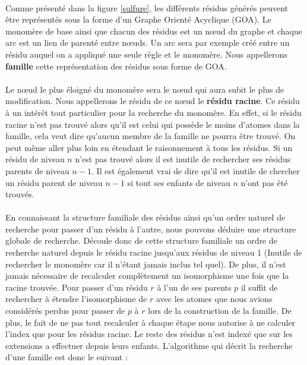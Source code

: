 \documentclass[12pt,french,twoside]{report}
\begin{document}
\paragraph{}Comme présenté dans la figure \ref{sulfure}, les différents résidus générés peuvent être représentés sous la forme
d'un Graphe Orienté Acyclique (GOA). Le monomère de base ainsi que chacun des résidus est un n\oe{}ud du graphe et chaque arc est un
lien de parenté entre n\oe{}uds. Un arc sera par exemple créé entre un résidu auquel on a appliqué une seule règle et le monomère.
Nous appellerons \textbf{famille} cette représentation des résidus sous forme de GOA.

\paragraph{}Le n\oe{}ud le plus éloigné du monomère sera le n\oe{}ud
qui aura subit le plus de modification. Nous appellerons le résidu de ce n\oe{}ud le \textbf{résidu racine}. Ce résidu à un intérêt
tout particulier pour la recherche du monomère. En effet, si le résidu racine n'est pas trouvé alors qu'il est celui
qui possède le moins d'atomes dans la famille, cela veut dire qu'aucun membre de la famille ne pourra être trouvé. On peut même
aller plus loin en étendant le raisonnement à tous les résidus. Si un résidu de niveau $n$ n'est pas trouvé alors il est inutile
de rechercher ses résidus parents de niveau $n-1$. Il est également vrai de dire qu'il est inutile de chercher un résidu parent de
niveau $n-1$ si tout ses enfants de niveau $n$ n'ont pas été trouvés.

\paragraph{}En connaissant la structure familiale des résidus ainsi qu'un ordre naturel de recherche pour passer d'un résidu à
l'autre, nous pouvons déduire une structure globale de recherche. Découle donc de cette structure familiale un ordre de recherche
naturel depuis le résidu racine jusqu'aux résidus de niveau 1 (Inutile de rechercher le monomère car il n'étant jamais inclus tel
quel). De plus, il n'est jamais nécessaire de
recalculer complètement un isomorphisme une fois que la racine trouvée. Pour passer d'un résidu $r$ à l'un de ses parents $p$ il
suffit de rechercher à étendre l'isomorphisme de $r$ avec les atomes que nous avions considérés perdus pour passer de $p$ à $r$
lors de la construction de la famille. De plus, le fait de ne pas tout recalculer à chaque étape nous autorise à ne calculer
l'index que pour les résidus racine. Le reste des résidus n'est indexé que sur les extensions a effectuer depuis leurs enfants.
L'algorithme qui décrit la recherche d'une famille est donc le suivant :
\end{document}
